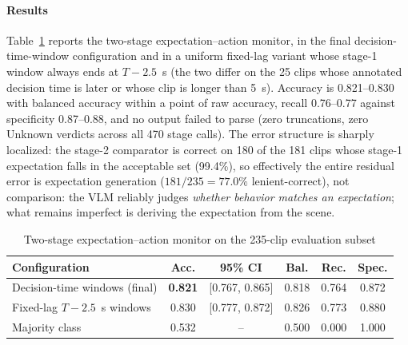 \documentclass[conference]{IEEEtran}
\begin{document}
\paragraph{Results} Table~\ref{tab:monitor} reports the two-stage expectation--action monitor, in the final decision-time-window configuration and in a uniform fixed-lag variant whose stage-1 window always ends at $T - 2.5$~s (the two differ on the 25 clips whose annotated decision time is later or whose clip is longer than 5~s). Accuracy is 0.821--0.830 with balanced accuracy within a point of raw accuracy, recall 0.76--0.77 against specificity 0.87--0.88, and no output failed to parse (zero truncations, zero Unknown verdicts across all 470 stage calls). The error structure is sharply localized: the stage-2 comparator is correct on 180 of the 181 clips whose stage-1 expectation falls in the acceptable set (99.4\%), so effectively the entire residual error is expectation generation ($181/235 = 77.0\%$ lenient-correct), not comparison: the VLM reliably judges \emph{whether behavior matches an expectation}; what remains imperfect is deriving the expectation from the scene.

\begin{table}[htbp]
\caption{Two-stage expectation--action monitor on the 235-clip evaluation subset}
\begin{center}
\footnotesize
\begin{tabular}{|l|c|c|c|c|c|}
\hline
\textbf{Configuration} & \textbf{Acc.} & \textbf{95\% CI} & \textbf{Bal.} & \textbf{Rec.} & \textbf{Spec.} \\
\hline
Decision-time windows (final) & \textbf{0.821} & [0.767, 0.865] & 0.818 & 0.764 & 0.872 \\
\hline
Fixed-lag $T-2.5$~s windows & 0.830 & [0.777, 0.872] & 0.826 & 0.773 & 0.880 \\
\hline
Majority class & 0.532 & -- & 0.500 & 0.000 & 1.000 \\
\hline
\end{tabular}
\label{tab:monitor}
\end{center}
\end{table}
\end{document}
